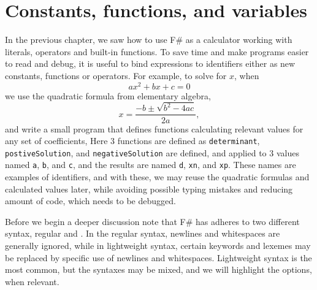 \chapter{Constants, functions, and variables}
\label{chap:let}
%
In the previous chapter, we saw how to use F\# as a calculator working with literals, operators and built-in functions. To save time and make programs easier to read and debug, it is useful to bind expressions to identifiers either as new constants, functions or operators. For example, to solve for  $x$, when
\begin{equation}
  a x^2+bx+c = 0
\end{equation}
we use the quadratic formula from elementary algebra,
\begin{equation}
  x = \frac{-b\pm\sqrt{b^2-4ac}}{2a},
\end{equation}
and write a small program that defines functions calculating relevant values for any set of coefficients,
%
%
Here 3 functions are defined as \lstinline!determinant!, \lstinline!postiveSolution!, and \lstinline!negativeSolution! are defined, and applied to 3 values named \lstinline!a!, \lstinline!b!, and \lstinline!c!, and the results are named \lstinline!d!, \lstinline!xn!, and \lstinline!xp!. These names are examples of identifiers, and with these, we may reuse the quadratic formulas and calculated values later, while avoiding possible typing mistakes and reducing amount of code, which needs to be debugged.

Before we begin a deeper discussion note that F\# has adheres to two different syntax, regular and . In the regular syntax, newlines and whitespaces are generally ignored, while in lightweight syntax, certain keywords and lexemes may be replaced by specific use of newlines and whitespaces. Lightweight syntax is the most common, but the syntaxes may be mixed, and we will highlight the options, when relevant.

